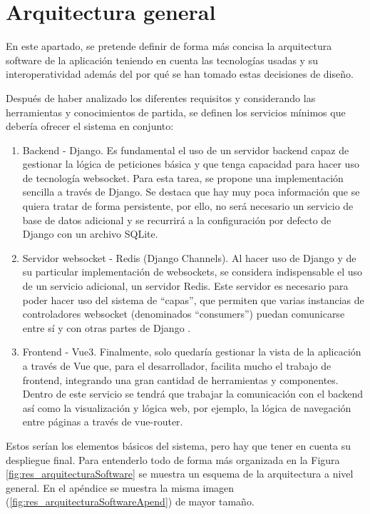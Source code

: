\section{Arquitectura general}

En este apartado, se pretende definir de forma más concisa la arquitectura software de la aplicación
teniendo en cuenta las tecnologías usadas y su interoperatividad además del por qué se han tomado estas decisiones de diseño.

Después de haber analizado los diferentes requisitos y considerando las herramientas y conocimientos de partida,
se definen los servicios mínimos que debería ofrecer el sistema en conjunto:

\begin{enumerate}
	\item Backend - Django. Es fundamental el uso de un servidor backend capaz de
	      gestionar la lógica de peticiones básica y que tenga capacidad para hacer uso de tecnología websocket.
	      Para esta tarea, se propone una implementación sencilla a través de Django. Se destaca que hay muy poca información que se
	      quiera tratar de forma persistente, por ello, no será necesario un servicio de base de datos adicional
	      y se recurrirá a la configuración por defecto de Django con un archivo SQLite.
	\item Servidor websocket - Redis (Django Channels). Al hacer uso de Django y de su particular implementación de
	      websockets, se considera indispensable el uso de un servicio adicional, un servidor Redis. Este servidor es necesario para
	      poder hacer uso del sistema de ``capas'', que permiten que varias instancias de controladores websocket
	      (denominados ``consumers'') puedan comunicarse entre sí y con otras partes de Django \cite{djangoChannelsLayers}.
	\item Frontend - Vue3. Finalmente, solo quedaría gestionar la vista de la aplicación a través de Vue
	      que, para el desarrollador, facilita mucho el trabajo de frontend, integrando una gran cantidad de herramientas y componentes.
	      Dentro de este servicio se tendrá que trabajar la comunicación con el backend así como la visualización y lógica
	      web, por ejemplo, la lógica de navegación entre páginas a través de vue-router.
\end{enumerate}

Estos serían los elementos básicos del sistema, pero hay que tener en cuenta su
despliegue final. Para entenderlo todo de forma más organizada en la Figura \ref{fig:res_arquitecturaSoftware} se muestra un esquema de la arquitectura
a nivel general. En el apéndice se muestra la misma imagen (\ref{fig:res_arquitecturaSoftwareApend}) de mayor tamaño.

